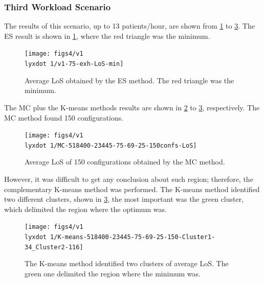\subsubsection{Third Workload Scenario}

The results of this scenario, up to 13 patients/hour, are shown from
\ref{subfig:es12-4} to \ref{subfig:km12-4}. The ES result is shown
in \ref{subfig:es12-4}, where the red triangle was the minimum.
\begin{figure}[H]
\centering{}\texttt{[image: figs4/v1\\lyxdot 1/v1-75-exh-LoS-min]}\caption{Average LoS obtained by the ES method. The red triangle was the minimum.\label{subfig:es12-4}}
\end{figure}


The MC plus the K-means methods results are shown in \ref{subfig:mc12-4}
to \ref{subfig:km12-4}, respectively. The MC method found 150 configurations.
\begin{figure}[H]
\centering{}\texttt{[image: figs4/v1\\lyxdot 1/MC-518400-23445-75-69-25-150confs-LoS]}\caption{Average LoS of 150 configurations obtained by the MC method.\label{subfig:mc12-4}}
\end{figure}
However, it was difficult to get any conclusion about such region;
therefore, the complementary K-means method was performed. The K-means
method identified two different clusters, shown in \ref{subfig:km12-4},
the most important was the green cluster, which delimited the region
where the optimum was.
\begin{figure}[H]
\begin{centering}
\texttt{[image: figs4/v1\\lyxdot 1/K-means-518400-23445-75-69-25-150-Cluster1-34\_Cluster2-116]}
\par\end{centering}

\caption{The K-means method identified two clusters of average LoS. The green
one delimited the region where the minimum was.\label{subfig:km12-4}}
\end{figure}



